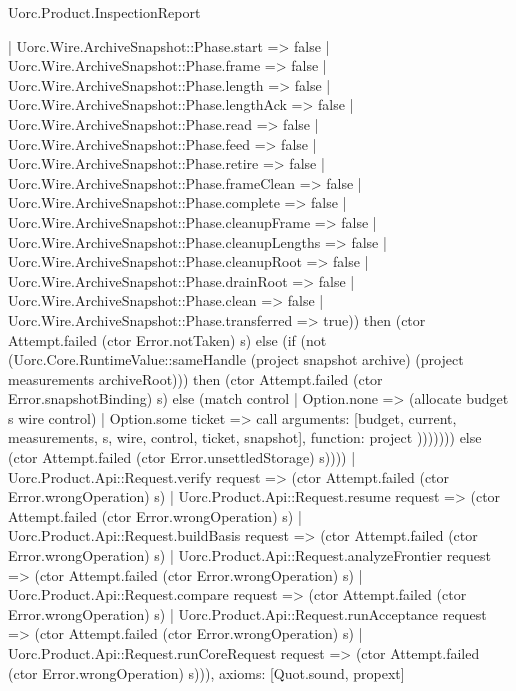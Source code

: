 \begin{lexlean}{Uorc.Product.InspectionReport}
\begin{semanticmodule}
{                | Uorc.Wire.ArchiveSnapshot::Phase.start => false
                | Uorc.Wire.ArchiveSnapshot::Phase.frame => false
                | Uorc.Wire.ArchiveSnapshot::Phase.length => false
                | Uorc.Wire.ArchiveSnapshot::Phase.lengthAck => false
                | Uorc.Wire.ArchiveSnapshot::Phase.read => false
                | Uorc.Wire.ArchiveSnapshot::Phase.feed => false
                | Uorc.Wire.ArchiveSnapshot::Phase.retire => false
                | Uorc.Wire.ArchiveSnapshot::Phase.frameClean => false
                | Uorc.Wire.ArchiveSnapshot::Phase.complete => false
                | Uorc.Wire.ArchiveSnapshot::Phase.cleanupFrame => false
                | Uorc.Wire.ArchiveSnapshot::Phase.cleanupLengths => false
                | Uorc.Wire.ArchiveSnapshot::Phase.cleanupRoot => false
                | Uorc.Wire.ArchiveSnapshot::Phase.drainRoot => false
                | Uorc.Wire.ArchiveSnapshot::Phase.clean => false
                | Uorc.Wire.ArchiveSnapshot::Phase.transferred => true)) then (ctor Attempt.failed (ctor Error.notTaken) s) else (if (not (Uorc.Core.RuntimeValue::sameHandle (project snapshot archive) (project measurements archiveRoot))) then (ctor Attempt.failed (ctor Error.snapshotBinding) s) else (match control
                | Option.none => (allocate budget s wire control)
                | Option.some ticket => call{
                  arguments: [budget, current, measurements, s, wire, control, ticket, snapshot],
                  function: project
                }))))))) else (ctor Attempt.failed (ctor Error.unsettledStorage) s))))
      | Uorc.Product.Api::Request.verify request => (ctor Attempt.failed (ctor Error.wrongOperation) s)
      | Uorc.Product.Api::Request.resume request => (ctor Attempt.failed (ctor Error.wrongOperation) s)
      | Uorc.Product.Api::Request.buildBasis request => (ctor Attempt.failed (ctor Error.wrongOperation) s)
      | Uorc.Product.Api::Request.analyzeFrontier request => (ctor Attempt.failed (ctor Error.wrongOperation) s)
      | Uorc.Product.Api::Request.compare request => (ctor Attempt.failed (ctor Error.wrongOperation) s)
      | Uorc.Product.Api::Request.runAcceptance request => (ctor Attempt.failed (ctor Error.wrongOperation) s)
      | Uorc.Product.Api::Request.runCoreRequest request => (ctor Attempt.failed (ctor Error.wrongOperation) s))),
  axioms: [Quot.sound, propext]
}


\end{semanticmodule}
\end{lexlean}
